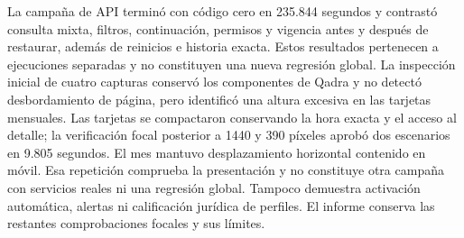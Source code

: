 La campaña de API terminó con código cero en 235.844 segundos y contrastó consulta mixta, filtros, continuación, permisos y vigencia antes y después de restaurar, además de reinicios e historia exacta. Estos resultados pertenecen a ejecuciones separadas y no constituyen una nueva regresión global. La inspección inicial de cuatro capturas conservó los componentes de Qadra y no detectó desbordamiento de página, pero identificó una altura excesiva en las tarjetas mensuales. Las tarjetas se compactaron conservando la hora exacta y el acceso al detalle; la verificación focal posterior a 1440 y 390 píxeles aprobó dos escenarios en 9.805 segundos. El mes mantuvo desplazamiento horizontal contenido en móvil. Esa repetición comprueba la presentación y no constituye otra campaña con servicios reales ni una regresión global. Tampoco demuestra activación automática, alertas ni calificación jurídica de perfiles. El informe  conserva las restantes comprobaciones focales y sus límites.
